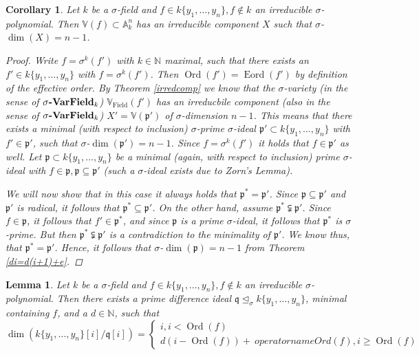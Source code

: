 \documentclass{article}
\newcommand{\catname}[1]{{\normalfont\textbf{#1}}}
\def\N{\mathbb{N}}
\def\VV{\mathbb{V}}
\def\p{\mathfrak{p}}
\def\q{\mathfrak{q}}
\def\s{\sigma}
\def\si{\unlhd_{\sigma}}
\def\dim{\operatorname{dim}}
\newenvironment{bew}{\begin{proof}[Proof]}{\end{proof}}
\theoremstyle{plain}
\newtheorem{cor}[Satz]{Corollary}
\newtheorem{lem}[Satz]{Lemma}
\theoremstyle{definition}
\begin{document}
\begin{cor}
Let $k$ be a $\s$-field and $f \in k\{y_1,\ldots,y_n\}, f \notin k$ an irreducible $\s$-polynomial. Then $\VV(f) \subset \mathbb{A}_k^n$ has an irreducible component $X$ such that $\s$-$\dim(X) = n-1$.
\begin{bew}
Write $f = \s^k(f')$ with $k \in \N$ maximal, such that there exists an $f' \in k\{y_1,\ldots,y_n\}$ with $f = \s^k(f')$. Then $\operatorname{Ord}(f') = \operatorname{Eord}(f')$ by definition of the effective order. 
By Theorem \ref{irredcomp} we know that the $\s$-variety (in the sense of $\s\text{\catname{-VarField}}_k$) $ \VV_{\operatorname{Field}}(f')$ has an irreducbile component (also in the sense of $\s\text{\catname{-VarField}}_k$) $X' = \VV(\p')$ of $\s$-dimension $n-1$.
This means that there exists a minimal (with respect to inclusion) $\s$-prime $\s$-ideal $\p' \subset k\{y_1,\ldots,y_n\}$ with $f' \in \p'$, such that $\s$-$\dim(\p') = n-1$. 
Since $f = \s^k(f')$ it holds that $f \in \p'$ as well. Let $\p \subset k\{y_1,\ldots,y_n\}$ be a minimal (again, with respect to inclusion) prime $\s$-ideal with $f \in \p, \p \subseteq \p'$ (such a $\s$-ideal exists due to Zorn's Lemma). 

We will now show that in this case it always holds that $\p^* = \p'$. Since $\p \subseteq \p'$ and $\p'$ is radical, it follows that $\p^* \subseteq \p'$. On the other hand, assume $\p^* \subsetneqq \p'$. Since $f \in \p$, it follows that $f' \in \p^*$,
and since $\p$ is a prime $\s$-ideal, it follows that $\p^*$ is $\s$-prime. But then $\p^* \subsetneqq \p'$ is a contradiction to the minimality of $\p'$. We know thus, that $\p^* = \p'$. Hence, it follows that $\s$-$\dim(\p) = n -1$ from Theorem \ref{di=d(i+1)+e}.

\end{bew}
\end{cor}

\begin{lem}
Let $k$ be a $\s$-field and $f \in k\{y_1,\ldots,y_n\}, f \notin k$ an irreducible $\s$-polynomial. 
Then there exists a prime difference ideal $\q \si k\{y_1,\ldots,y_n\}$, minimal containing $f$, and a $d \in \N$, such that 
$$\dim(k\{y_1,\ldots,y_n\}[i]/\q[i]) = \left\{ \begin{array}{lr} i, i < \operatorname{Ord}(f) \\ d(i-\operatorname{Ord}(f)) +\ operatorname{Ord}(f),
 i \geq \operatorname{Ord}(f) \end{array} \right.$$
\end{lem}
\end{document}
